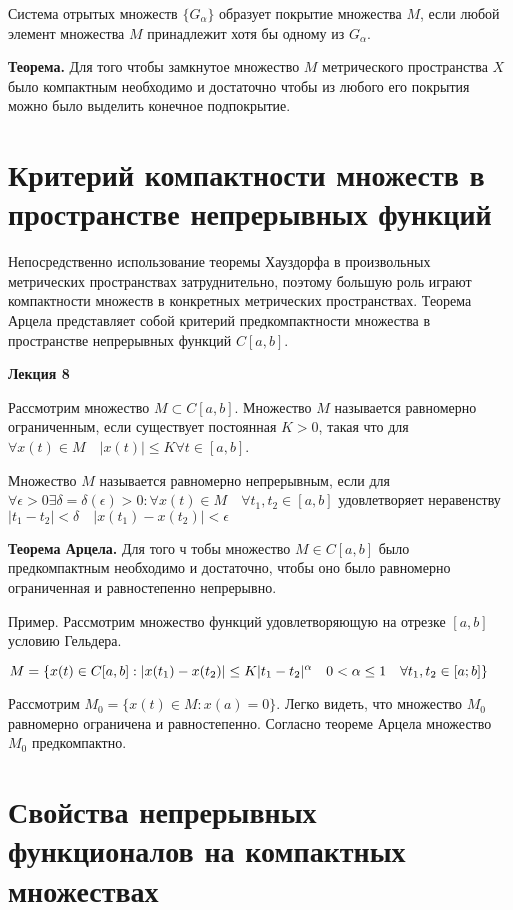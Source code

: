 \documentclass[12pt]{report}
\renewcommand{\[}{$\\\displaystyle}
\renewcommand{\]}{\\$}
\renewcommand{\[}{$\\\displaystyle}
\newcommand{\tth}[1][]{\textbf{Теорема#1.}}
\begin{document}
Система отрытых множеств $\{G_\alpha\}$ образует покрытие множества $M$, если любой элемент множества $M$ принадлежит хотя бы одному из $G_\alpha$.

\tth[] Для того чтобы замкнутое множество $M$ метрического пространства $X$ было компактным необходимо и достаточно чтобы из любого его покрытия можно было выделить конечное подпокрытие.

\section{Критерий компактности множеств в пространстве непрерывных функций}

Непосредственно использование теоремы Хауздорфа в произвольных метрических пространствах затруднительно, поэтому большую роль играют компактности множеств в конкретных метрических пространствах. Теорема Арцела представляет собой критерий предкомпактности множества в пространстве непрерывных функций $C[a,b]$.

\textbf{Лекция 8}

Рассмотрим множество $M\subset C[a,b]$. Множество $M$ называется равномерно ограниченным, если существует постоянная $K>0$, такая что для $\forall x(t)\in M \quad |x(t)|\leq K \forall t \in [a,b]$.

Множество $M$ называется равномерно непрерывным, если для $\forall \epsilon > 0 \exists \delta = \delta(\epsilon)>0:\forall x(t)\in M\quad \forall t_1,t_2\in [a,b]$ удовлетворяет неравенству $|t_1-t_2|<\delta \quad |x(t_1)-x(t_2)|<\epsilon$

\tth[ Арцела] Для того ч тобы множество $M\in C[a,b]$ было предкомпактным необходимо и достаточно, чтобы оно было равномерно ограниченная и равностепенно непрерывно.

Пример. Рассмотрим множество функций удовлетворяющую на отрезке $[a,b]$ условию Гельдера.

\[
M=\{x(t)\in C[a,b]: |x(t_1)-x(t_2)|\leq K|t_1-t_2|^\alpha \quad 0 < \alpha \leq 1 \quad \forall t_1,t_2 \in [a;b]\}
\]

Рассмотрим $M_0=\{x(t)\in M:x(a)=0\}$. Легко видеть, что множество $M_0$ равномерно ограничена и равностепенно. Согласно теореме Арцела множество $M_0$ предкомпактно.

\section{Свойства непрерывных функционалов на компактных множествах}
\end{document}
